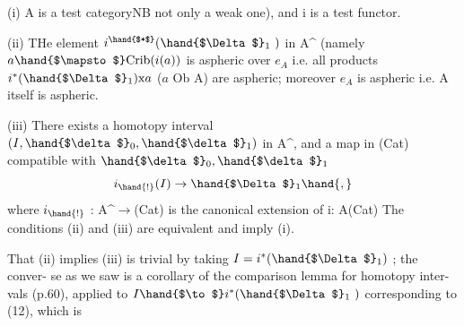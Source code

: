 (i)  A is a test category\hand{(}NB not only a weak one),  and i is a  test
functor.

(ii)  THe element $i^{\hand{$*$}}(\hand{$\Delta$}_{1}\ )$ in A\^{} (namely  $a\hand{$\mapsto$}\mathrm{Crib}(i(a))$ is aspheric
over $e_{A\hat{}}$  i.e. all products  $i^{*}(\hand{$\Delta$}_{1})\mathrm{x}a$  ($a$ \hand{$\in$} Ob A) are aspheric;
moreover $e_{A\hat{}}$  is aspheric i.e.  A  itself is aspheric.

(iii)  There exists a homotopy interval  $(I,\hand{$\delta$}_{0},\hand{$\delta$}_{1})$ in A\^{}, and a map
in (Cat)  compatible with $\hand{$\delta$}_{0},\hand{$\delta$}_{1}$
 \[ i_{\hand{!}}(I)\to\hand{$\Delta$}_{1}\hand{,} \]
where $i_{\hand{!}}$ : A\^{}$\to$(Cat)  is the canonical extension of i: A\hand{$\to$}(Cat)\hand{;}
The conditions  (ii)  and (iii) are equivalent and imply (i).

That (ii) implies (iii) is trivial by taking $I = i^{*}(\hand{$\Delta$}_{1})$ ;  the conver-%
se\hand{,} as we saw\hand{,} is a corollary of the comparison lemma for homotopy inter-%
vals  (p.60),  applied to  $I\hand{$\to$}i^{*}(\hand{$\Delta$}_{1}\ )$  corresponding to (12),  which is
